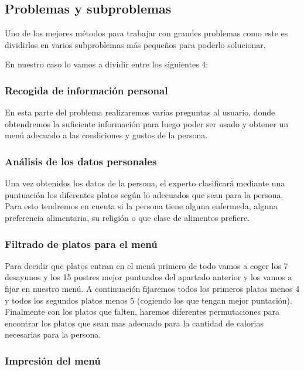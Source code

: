 \documentclass[11]{article}
\begin{document}
\subsection{Problemas y subproblemas}

Uno de los mejores métodos para trabajar con grandes problemas como este es dividirlos en varios subproblemas más pequeños para poderlo solucionar.

En nuestro caso lo vamos a dividir entre los siguientes 4:

\subsubsection{Recogida de información personal}

En esta parte del problema realizaremos varias preguntas al usuario, donde obtendremos la suficiente información para luego poder ser usado y obtener un menú adecuado a las condiciones y gustos de la persona.

\subsubsection{Análisis de los datos personales}

Una vez obtenidos los datos de la persona, el experto clasificará mediante una puntuación los diferentes platos según lo adecuados que sean para la persona. Para esto tendremos en cuenta si la persona tiene alguna enfermeda, alguna preferencia alimentaria, su religión o que clase de alimentos prefiere.

\subsubsection{Filtrado de platos para el menú}

Para decidir que platos entran en el menú primero de todo vamos a coger los 7 desayunos y los 15 postres mejor puntuados del apartado anterior y los vamos a fijar en nuestro menú. A continuación fijaremos todos los primeros platos menos 4 y todos los segundos platos menos 5 (cogiendo los que tengan mejor puntación).
Finalmente con los platos que falten, haremos diferentes permutaciones para encontrar los platos que sean mas adecuado para la cantidad de calorias necesarias para la persona.

\subsubsection{Impresión del menú}
\end{document}
